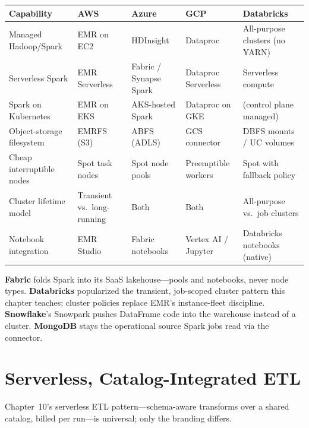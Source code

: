 \begin{center}
\footnotesize
\begin{tabular}{@{}p{2.4cm}p{2.9cm}p{2.9cm}p{2.9cm}p{2.9cm}@{}}
\toprule
\textbf{Capability} & \textbf{AWS} & \textbf{Azure} & \textbf{GCP} & \textbf{Databricks} \\
\midrule
Managed Hadoop/Spark & EMR on EC2 & HDInsight & Dataproc & All-purpose clusters (no YARN) \\
Serverless Spark & EMR Serverless & Fabric / Synapse Spark & Dataproc Serverless & Serverless compute \\
Spark on Kubernetes & EMR on EKS & AKS-hosted Spark & Dataproc on GKE & (control plane managed) \\
Object-storage filesystem & EMRFS (S3) & ABFS (ADLS) & GCS connector & DBFS mounts / UC volumes \\
Cheap interruptible nodes & Spot task nodes & Spot node pools & Preemptible workers & Spot with fallback policy \\
\addlinespace
Cluster lifetime model & Transient vs.\ long-running & Both & Both & All-purpose vs.\ job clusters \\
Notebook integration & EMR Studio & Fabric notebooks & Vertex AI / Jupyter & Databricks notebooks (native) \\
\bottomrule
\end{tabular}
\end{center}

\noindent \textbf{Fabric} folds Spark into its SaaS lakehouse---pools and notebooks, never node
types. \textbf{Databricks} popularized the transient, job-scoped cluster pattern this chapter
teaches; cluster policies replace EMR's instance-fleet discipline. \textbf{Snowflake}'s Snowpark
pushes DataFrame code into the warehouse instead of a cluster. \textbf{MongoDB} stays the
operational source Spark jobs read via the connector.

\section{Serverless, Catalog-Integrated ETL}
%
Chapter~10's serverless ETL pattern---schema-aware transforms over a shared catalog, billed per
run---is universal; only the branding differs.

